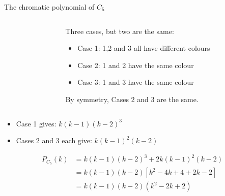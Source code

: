 \documentclass{beamer}
\begin{document}
\begin{frame}{The chromatic polynomial of $C_5$}
  \begin{columns}
    \begin{column}{.3\textwidth}
    \end{column}

    \begin{column}{.7\textwidth}
      \begin{block}{Three cases, but two are the same:}
        \begin{itemize}
        \item Case 1: 1,2 and 3 all have different colours
        \item Case 2: 1 and 2 have the same colour
        \item Case 3: 1 and 3 have the same colour
        \end{itemize}
        By symmetry, Cases 2 and 3 are the same.
      \end{block}
    \end{column}
    \end{columns}
  \begin{itemize}
  \item Case 1 gives: $k(k-1)(k-2)^3$
  \item Cases 2 and 3 each give: $k(k-1)^2(k-2)$
  \end{itemize}
\begin{align*}
  P_{C_5}(k)&=k(k-1)(k-2)^3+2k(k-1)^2(k-2) \\
  &=k(k-1)(k-2)\left[k^2-4k+4+2k-2\right] \\
  &=k(k-1)(k-2)(k^2-2k+2)
  \end{align*}

  

  \end{frame}
  
\end{document}
